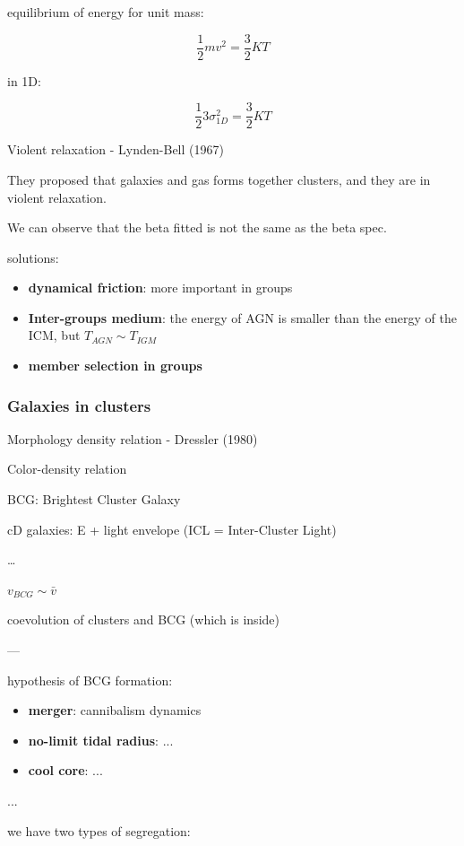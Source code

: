equilibrium of energy for unit mass:

$$
\dfrac 12 m v^2 = \dfrac 32 KT
$$

in 1D:

$$
\dfrac 12 3 \sigma_{1D}^2 = \dfrac 32 KT
$$

Violent relaxation - Lynden-Bell (1967) %

They proposed that galaxies and gas forms together clusters, and they are in violent relaxation.

We can observe that the beta fitted is not the same as the beta spec. %

solutions:

\begin{itemize}
    \item \textbf{dynamical friction}: more important in groups
    \item \textbf{Inter-groups medium}: the energy of AGN is smaller than the energy of the ICM, but $T_{AGN} \sim T_{IGM}$ %
    \item \textbf{member selection in groups}
\end{itemize}

\subsubsection{Galaxies in clusters}

Morphology density relation - Dressler (1980) 

Color-density relation

BCG: Brightest Cluster Galaxy

cD galaxies: E + light envelope (ICL = Inter-Cluster Light)

\dots

$v_{BCG} \sim \bar v$

coevolution of clusters and BCG (which is inside)

---

hypothesis of BCG formation:

\begin{itemize}
    \item \textbf{merger}: cannibalism dynamics
    \item \textbf{no-limit tidal radius}: ...
    \item \textbf{cool core}: ...
\end{itemize}

...

we have two types of segregation:

